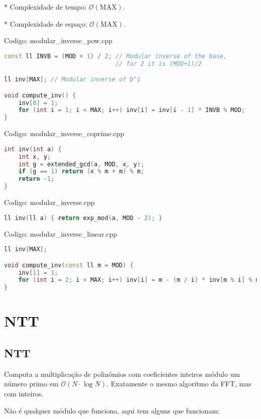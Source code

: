 \documentclass[10pt, a4paper, oneside]{book}
\begin{document}
* Complexidade de tempo: $\mathcal{O}(\text{MAX})$.

* Complexidade de espaço: $\mathcal{O}(\text{MAX})$.
\hfill

Codigo: modular\_inverse\_pow.cpp

\begin{lstlisting}[language=C++]
const ll INVB = (MOD + 1) / 2; // Modular inverse of the base,
                               // for 2 it is (MOD+1)/2

ll inv[MAX]; // Modular inverse of b^i

void compute_inv() {
    inv[0] = 1;
    for (int i = 1; i < MAX; i++) inv[i] = inv[i - 1] * INVB % MOD;
}
\end{lstlisting}
\hfill

Codigo: modular\_inverse\_coprime.cpp

\begin{lstlisting}[language=C++]
int inv(int a) {
    int x, y;
    int g = extended_gcd(a, MOD, x, y);
    if (g == 1) return (x % m + m) % m;
    return -1;
}
\end{lstlisting}
\hfill

Codigo: modular\_inverse.cpp

\begin{lstlisting}[language=C++]
ll inv(ll a) { return exp_mod(a, MOD - 2); }
\end{lstlisting}
\hfill

Codigo: modular\_inverse\_linear.cpp

\begin{lstlisting}[language=C++]
ll inv[MAX];

void compute_inv(const ll m = MOD) {
    inv[1] = 1;
    for (int i = 2; i < MAX; i++) inv[i] = m - (m / i) * inv[m % i] % m;
}
\end{lstlisting}
\hfill

\section{NTT}
\subsection{NTT}


Computa a multiplicação de polinômios com coeficientes inteiros módulo um número primo em $\mathcal{O}(N \cdot \log N)$. Exatamente o mesmo algoritmo da FFT, mas com inteiros.



Não é qualquer módulo que funciona, aqui tem alguns que funcionam:
\end{document}
